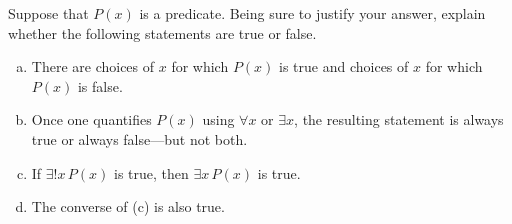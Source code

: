 \documentclass[11pt,letterpaper]{article}
\begin{document}

 Suppose that $P(x)$ is a predicate. Being sure to justify your answer, explain whether the following statements are true or false.
	\begin{enumerate}[(a)]
	\item There are choices of $x$ for which $P(x)$ is true and choices of $x$ for which $P(x)$ is false.
	\item Once one quantifies $P(x)$ using $\forall x$ or $\exists x$, the resulting statement is always true or always false---but not both.
	\item If $\exists!x\, P(x)$ is true, then $\exists x\, P(x)$ is true. 
	\item The converse of (c) is also true.
	\end{enumerate} \pspace
\end{document}
